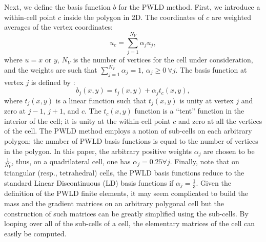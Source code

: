 Next, we define the basis function $b$ for the PWLD method. First, we
introduce a within-cell point $c$ inside the polygon in 2D. The coordinates 
of $c$ are weighted averages of the vertex coordinates:
\begin{equation}
  u_c = \sum_{j=1}^{N_V} \alpha_j u_j,
\end{equation}
where $u=x$ or $y$, $N_V$ is the number of vertices for the cell under
consideration, and the weights are such that $\sum_{j=1}^{N_V} \alpha_j =1$,
$\alpha_j \geq 0\ \forall j$. The basis function at vertex $j$ is defined by 
\cite{pwld_2d}:
\begin{equation}
  b_j(x,y) = t_j(x,y) + \alpha_j t_c(x,y),
\end{equation}
where $t_j(x,y)$ is a linear function such that $t_j(x,y)$ is unity at vertex
$j$ and zero at $j-1$, $j+1$, and $c$. The $t_c(x,y)$ function is a ``tent''
function in the interior of the cell; it is unity at the within-cell point $c$
and zero at all the vertices of the cell. The PWLD method employs a notion of 
sub-cells on each arbitrary polygon; the number of PWLD basis functions is 
equal to the number of vertices in the polygon. In this paper, the arbitrary
positive weights $\alpha_j$ are chosen to be $\frac{1}{N_V}$, thus, on a
quadrilateral cell, one has $\alpha_j =0.25 \forall j$. Finally, note that on
triangular (resp., tetrahedral) cells, the PWLD basis functions reduce to the
standard Linear Discontinuous (LD) basis functions if $\alpha_j =
\frac{1}{3}$. Given the definition of the PWLD
finite elements, it may seem complicated to build the mass and the gradient
matrices on an arbitrary polygonal cell but the construction of such matrices
can be greatly simplified using the sub-cells. By looping over all of the
sub-cells of a cell, the elementary matrices of the cell can easily be
computed.
